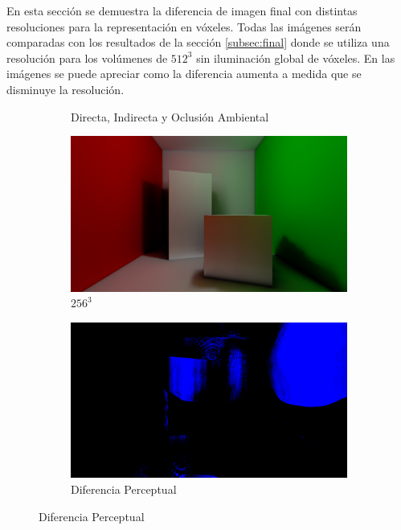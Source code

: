 En esta sección se demuestra la diferencia de imagen final con distintas resoluciones para la representación en vóxeles. Todas las imágenes serán comparadas con los resultados de la sección \ref{subsec:final} donde se utiliza una resolución para los volúmenes de $512^3$ sin iluminación global de vóxeles. En las imágenes se puede apreciar como la diferencia aumenta a medida que se disminuye la resolución.

\begin{figure}[H]
	\centering
	\begin{subfigure}[b]{.49\linewidth}
		\centering
		\captionsetup{justification=centering}
		\caption*{Directa, Indirecta y Oclusión Ambiental}
		\includegraphics[width=\linewidth]{media/finals/cornell_gi_256.png}
		\caption*{$256^3$}
	\end{subfigure}%
	\hspace{0.01\textwidth}
	\begin{subfigure}[b]{.49\linewidth}
		\centering
		\captionsetup{justification=centering}
		\caption*{Diferencia Perceptual\\}
		\includegraphics[width=\linewidth]{media/finals/cornell_gi_256_diff.png}

\end{subfigure}
\end{figure}
